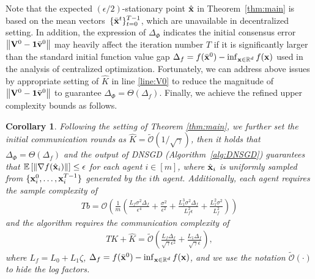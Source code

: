 \documentclass[sigconf]{acmart}
\newcommand{\Norm}[1]{\left\| #1 \right\|}
\def\vone{{\bf{1}}}
\def\vv{{\bf{v}}}
\def\vx{{\bf{x}}}
\def\fO{{\mathcal{O}}}
\def\BE{{\mathbb{E}}}
\def\BR{{\mathbb{R}}}
\def\mV {{\bf V}}
\theoremstyle{plain}
\newtheorem{cor}{Corollary}
\def\bx{{\bar\vx}}
\def\bv{{\bar\vv}}
\begin{document}
Note that the expected $(\epsilon/2)$-stationary point $\hat\vx$ in Theorem~\ref{thm:main} is based on the mean vectors~$\{\bx^t\}_{t=0}^{T-1}$, which are unavailable in decentralized setting. 
In addition, the expression of $\Delta_{\Phi}$ indicates the initial consensus error $\Norm{\mV^0-\vone\bv^0}$ may heavily affect the iteration number $T$ if it is significantly larger than the standard initial function value gap
$\Delta_f=f(\bx^0) - \inf_{\vx\in\BR^d} f(\vx)$
used in the analysis of centralized optimization.
Fortunately, we can address above issues by appropriate setting of $\hat K$ in line \ref{line:V0} to reduce the magnitude of $\Norm{\mV^0-\vone\bv^0}$ to guarantee
$\Delta_\Phi=\Theta(\Delta_f)$.
Finally, we achieve the refined upper complexity bounds as follows.
\begin{cor}\label{cor:main}
    Following the setting of Theorem \ref{thm:main}, we further set the initial communication rounds as $\hat K=\tilde\fO(1/\sqrt{\gamma})$, then it holds that~$\Delta_\Phi=\Theta(\Delta_f)$ and the output of DNSGD (Algorithm~\ref{alg:DNSGD}) guarantees that $\BE\left[\Norm{\nabla f(\hat\vx_i)}\right] \leq \epsilon$ for each agent $i\in[m]$, where $\hat\vx_i$ is uniformly sampled from $\{\vx_i^0,\dots,\vx_i^{T-1}\}$ generated by the $i$th agent.
    Additionally, each agent requires the sample complexity of
    \begin{align}\label{eq:upper-bound-sample}
    Tb = \fO\left(\frac{1}{m}\left(\frac{L_f\sigma^2\Delta_f}{\epsilon^4} + \frac{\sigma^2}{\epsilon^2} + \frac{L_1^3\sigma^2\Delta_f}{L_f^2 \epsilon} + \frac{L_1^2\sigma^2 }{L_f^2} \right)\right) 
    \end{align}
    and the algorithm requires the communication complexity of 
    \begin{align*}
        TK+\hat K = \tilde\fO\left(\frac{L_f\Delta_f}{\sqrt{\gamma}\epsilon^2} + \frac{L_1\Delta_f}{\sqrt{\gamma}\epsilon}\right),
    \end{align*}
    where $L_f=L_0+L_1\zeta$, $\Delta_f=f(\bx^0) - \inf_{\vx\in\BR^d} f(\vx)$, and we use the notation $\tilde\fO(\cdot)$ to hide the log factors.
\end{cor}
\end{document}
